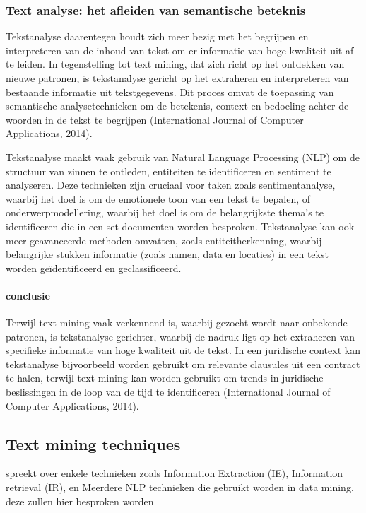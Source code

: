 \subsubsection{Text analyse: het afleiden van semantische beteknis}
Tekstanalyse daarentegen houdt zich meer bezig met het begrijpen en interpreteren van de inhoud van tekst om er informatie van hoge kwaliteit uit af te leiden. In tegenstelling tot text mining, dat zich richt op het ontdekken van nieuwe patronen, is tekstanalyse gericht op het extraheren en interpreteren van bestaande informatie uit tekstgegevens. Dit proces omvat de toepassing van semantische analysetechnieken om de betekenis, context en bedoeling achter de woorden in de tekst te begrijpen (International Journal of Computer Applications, 2014).

Tekstanalyse maakt vaak gebruik van Natural Language Processing (NLP) om de structuur van zinnen te ontleden, entiteiten te identificeren en sentiment te analyseren. Deze technieken zijn cruciaal voor taken zoals sentimentanalyse, waarbij het doel is om de emotionele toon van een tekst te bepalen, of onderwerpmodellering, waarbij het doel is om de belangrijkste thema's te identificeren die in een set documenten worden besproken. Tekstanalyse kan ook meer geavanceerde methoden omvatten, zoals entiteitherkenning, waarbij belangrijke stukken informatie (zoals namen, data en locaties) in een tekst worden geïdentificeerd en geclassificeerd.

\paragraph{conclusie}
Terwijl text mining vaak verkennend is, waarbij gezocht wordt naar onbekende patronen, is tekstanalyse gerichter, waarbij de nadruk ligt op het extraheren van specifieke informatie van hoge kwaliteit uit de tekst. In een juridische context kan tekstanalyse bijvoorbeeld worden gebruikt om relevante clausules uit een contract te halen, terwijl text mining kan worden gebruikt om trends in juridische beslissingen in de loop van de tijd te identificeren (International Journal of Computer Applications, 2014).


\subsection{Text mining techniques}
\autocite{Talib2016TextMining} spreekt over enkele technieken zoals Information Extraction (IE), Information retrieval (IR), en Meerdere NLP technieken die gebruikt worden in data mining, deze zullen hier besproken worden


